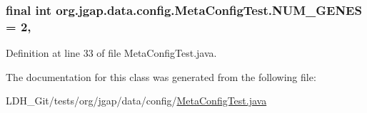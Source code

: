 \hypertarget{classorg_1_1jgap_1_1data_1_1config_1_1_meta_config_test_a662b5ac959bf31e901598913caeee288}{
\subsubsection[{N\-U\-M\-\_\-\-G\-E\-N\-E\-S}]{\setlength{\rightskip}{0pt plus 5cm}final int org.\-jgap.\-data.\-config.\-Meta\-Config\-Test.\-N\-U\-M\-\_\-\-G\-E\-N\-E\-S = 2\hspace{0.3cm}{\ttfamily [static]}, {\ttfamily [private]}}}\label{classorg_1_1jgap_1_1data_1_1config_1_1_meta_config_test_a662b5ac959bf31e901598913caeee288}


Definition at line 33 of file Meta\-Config\-Test.\-java.



The documentation for this class was generated from the following file\-:\begin{DoxyCompactItemize}
\item 
L\-D\-H\-\_\-\-Git/tests/org/jgap/data/config/\hyperlink{_meta_config_test_8java}{Meta\-Config\-Test.\-java}\end{DoxyCompactItemize}
